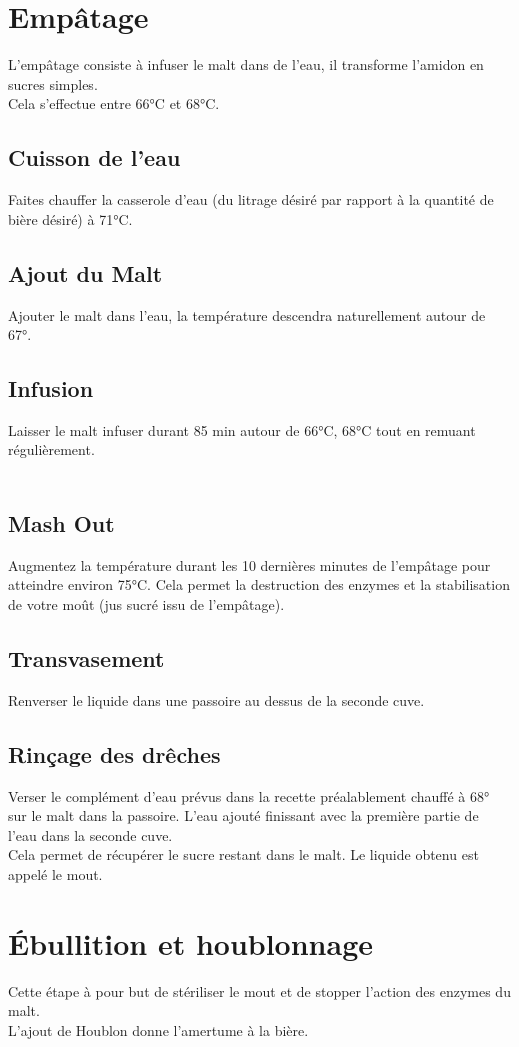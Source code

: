 \documentclass[twoside,twocolumn]{report}
\begin{document}
		\section{Empâtage}
		L'empâtage consiste à infuser le malt dans de l'eau, il transforme l'amidon en sucres simples.\\
		Cela s'effectue entre 66°C et 68°C.
		\subsection{Cuisson de l'eau}
		Faites chauffer la casserole d'eau (du litrage désiré par rapport à la quantité de bière désiré) à 71°C.\\
		\subsection{Ajout du Malt}
		Ajouter le malt dans l'eau, la température descendra naturellement autour de 67°.
		\subsection{Infusion}
		Laisser le malt infuser durant 85 min autour de 66°C, 68°C tout en remuant régulièrement.\\ \\
		\subsection{ Mash Out}
		Augmentez la température durant les 10 dernières minutes de l’empâtage pour atteindre environ 75°C. Cela  permet la destruction des
		enzymes et la stabilisation de votre moût  (jus  sucré issu  de l’empâtage).
		\subsection{Transvasement }
		Renverser le liquide dans une passoire au dessus de la seconde cuve.\\
		\subsection{Rinçage des drêches}
		Verser le complément d'eau prévus dans la recette préalablement chauffé à 68° sur le malt dans la passoire. L'eau ajouté finissant avec la première partie de l'eau dans la seconde cuve.\\
		Cela permet de récupérer le sucre restant dans le malt. Le liquide obtenu est appelé le mout.
		
		\section{Ébullition et houblonnage}
		Cette étape à pour but de stériliser le mout et de stopper l'action des enzymes du malt.\\ L'ajout de Houblon donne l'amertume à la bière.
\end{document}

